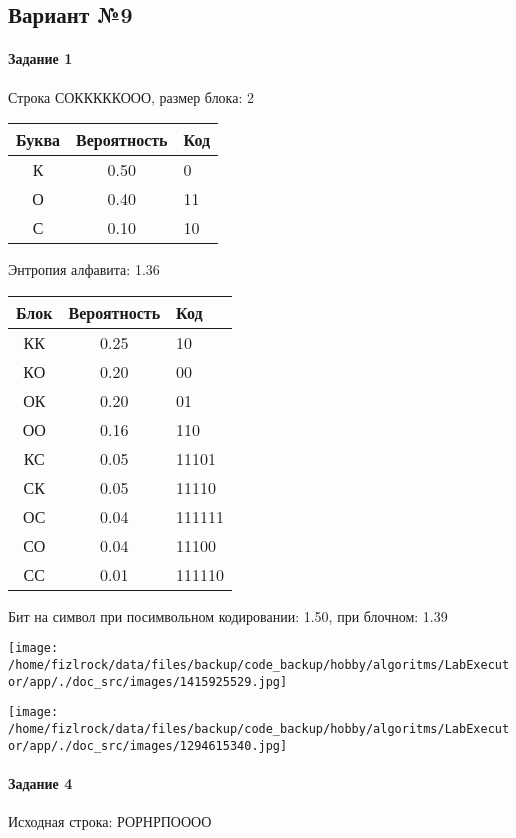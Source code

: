\documentclass[a4paper, 12pt]{article}
\begin{document}
\subsection{Вариант №9}
\paragraph{Задание 1}

Строка СОКККККООО, размер блока: 2
\begin{center}
 \begin{tabular}{ |c|c|l| } 
  \hline
     Буква & Вероятность & Код\\ \hline
К & 0.50 & 0\\\hline
О & 0.40 & 11\\\hline
С & 0.10 & 10
\\ \hline \end{tabular}
\end{center}
Энтропия алфавита: 1.36
\begin{center}
 \begin{tabular}{ |c|c|l| } 
  \hline
     Блок & Вероятность & Код\\ \hline
КК & 0.25 & 10\\\hline
КО & 0.20 & 00\\\hline
ОК & 0.20 & 01\\\hline
ОО & 0.16 & 110\\\hline
КС & 0.05 & 11101\\\hline
СК & 0.05 & 11110\\\hline
ОС & 0.04 & 111111\\\hline
СО & 0.04 & 11100\\\hline
СС & 0.01 & 111110
\\ \hline \end{tabular}
\end{center}
Бит на символ при посимвольном кодировании: 1.50, при блочном: 1.39

\texttt{[image: /home/fizlrock/data/files/backup/code\_backup/hobby/algoritms/LabExecutor/app/./doc\_src/images/1415925529.jpg]}

\texttt{[image: /home/fizlrock/data/files/backup/code\_backup/hobby/algoritms/LabExecutor/app/./doc\_src/images/1294615340.jpg]}
\paragraph{Задание 4}


Исходная строка: РОРНРПОООО
\end{document}
